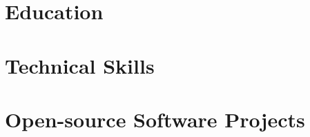 \documentclass[11pt]{article}
\begin{document}
\section*{\selectfont Education}



\section*{\selectfont Technical Skills} 


\section*{\selectfont Open-source Software Projects} 
 



% 



% 

% 
 

%
\end{document}
